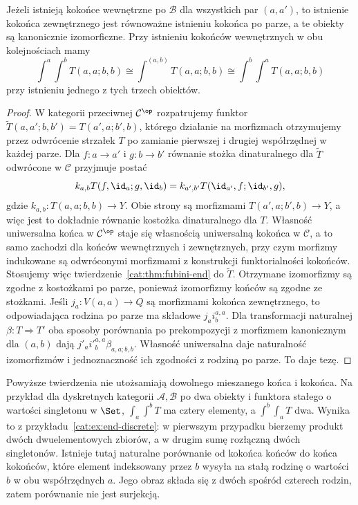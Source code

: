 \begin{twierdzenie}\label{cat:thm:fubini-coend}
Jeżeli istnieją kokońce wewnętrzne po $\mathcal B$ dla wszystkich par $(a,a')$, to istnienie kokońca zewnętrznego jest równoważne istnieniu kokońca po parze, a te obiekty są kanonicznie izomorficzne. Przy istnieniu kokońców wewnętrznych w obu kolejnościach mamy
\[
 \int^a\int^b T(a,a;b,b)
 \cong\int^{(a,b)}T(a,a;b,b)
 \cong\int^b\int^a T(a,a;b,b)
\]
przy istnieniu jednego z tych trzech obiektów.
\end{twierdzenie}
\begin{proof}
W kategorii przeciwnej $\mathcal C^{\op}$ rozpatrujemy funktor $\widetilde T(a,a';b,b')=T(a',a;b',b)$, którego działanie na morfizmach otrzymujemy przez odwrócenie strzałek $T$ po zamianie pierwszej i drugiej współrzędnej w każdej parze. Dla $f:a\to a'$ i $g:b\to b'$ równanie stożka dinaturalnego dla $\widetilde T$ odwrócone w $\mathcal C$ przyjmuje postać
\[
 k_{a,b}T(f,\id_a;g,\id_b)
 =k_{a',b'}T(\id_{a'},f;\id_{b'},g),
\]
gdzie $k_{a,b}:T(a,a;b,b)\to Y$. Obie strony są morfizmami $T(a',a;b',b)\to Y$, a więc jest to dokładnie równanie kostożka dinaturalnego dla $T$. Własność uniwersalna końca w $\mathcal C^{\op}$ staje się własnością uniwersalną kokońca w $\mathcal C$, a to samo zachodzi dla końców wewnętrznych i zewnętrznych, przy czym morfizmy indukowane są odwróconymi morfizmami z konstrukcji funktorialności kokońców. Stosujemy więc twierdzenie~\ref{cat:thm:fubini-end} do $\widetilde T$. Otrzymane izomorfizmy są zgodne z kostożkami po parze, ponieważ izomorfizmy końców są zgodne ze stożkami. Jeśli $j_a:V(a,a)\to Q$ są morfizmami kokońca zewnętrznego, to odpowiadająca rodzina po parze ma składowe $j_a i^{a,a}_b$. Dla transformacji naturalnej $\beta:T\Rightarrow T'$ oba sposoby porównania po prekompozycji z morfizmem kanonicznym dla $(a,b)$ dają $j'_a i'^{a,a}_b\beta_{a,a;b,b}$. Własność uniwersalna daje naturalność izomorfizmów i jednoznaczność ich zgodności z rodziną po parze. To daje tezę.
\end{proof}
\begin{uwaga}
Powyższe twierdzenia nie utożsamiają dowolnego mieszanego końca i kokońca. Na przykład dla dyskretnych kategorii $\mathcal A,\mathcal B$ po dwa obiekty i funktora stałego o wartości singletonu w $\Set$, $\int_a\int^b T$ ma cztery elementy, a $\int^b\int_a T$ dwa. Wynika to z przykładu~\ref{cat:ex:end-discrete}: w pierwszym przypadku bierzemy produkt dwóch dwuelementowych zbiorów, a w drugim sumę rozłączną dwóch singletonów. Istnieje tutaj naturalne porównanie od kokońca końców do końca kokońców, które element indeksowany przez $b$ wysyła na stałą rodzinę o wartości $b$ w obu współrzędnych $a$. Jego obraz składa się z dwóch spośród czterech rodzin, zatem porównanie nie jest surjekcją.
\end{uwaga}

